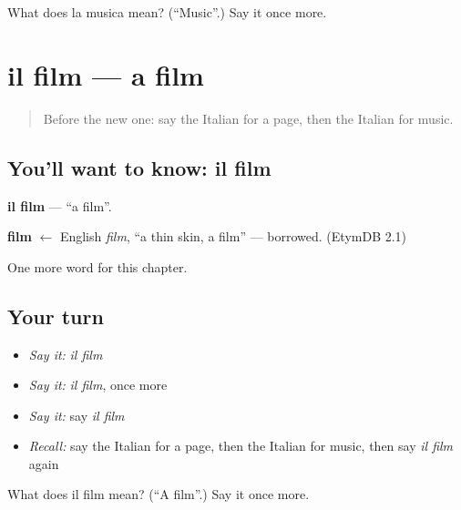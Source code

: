 \begin{tcolorbox}[breakable,colback=teal!4,colframe=teal!35!black,title={Before you move on}]
What does la musica mean? (\textquotedblleft{}Music\textquotedblright{}.) Say it once more.
\end{tcolorbox}
\section[il film]{il film — a film}

\label{lesson:IT-C116-film}



\begin{quote}
Before the new one: say the Italian for a page, then the Italian for music.
\end{quote}

\subsection*{You'll want to know: il film}
\textbf{il film} — \textquotedblleft{}a film\textquotedblright{}.

\begin{cousinweb}
\textbf{film} $\leftarrow$ English \emph{film}, \textquotedblleft{}a thin skin, a film\textquotedblright{} — borrowed. (EtymDB 2.1)
\end{cousinweb}

\begin{grammarlens}[title={What you've built}]
One more word for this chapter.
\end{grammarlens}

\subsection*{Your turn}
\begin{itemize}
\raggedright
  \item \emph{Say it:} \emph{il film}
  \item \emph{Say it:} \emph{il film}, once more
  \item \emph{Say it:} say \emph{il film}
  \item \emph{Recall:} say the Italian for a page, then the Italian for music, then say \emph{il film} again
\end{itemize}

\begin{tcolorbox}[breakable,colback=teal!4,colframe=teal!35!black,title={Before you move on}]
What does il film mean? (\textquotedblleft{}A film\textquotedblright{}.) Say it once more.
\end{tcolorbox}
